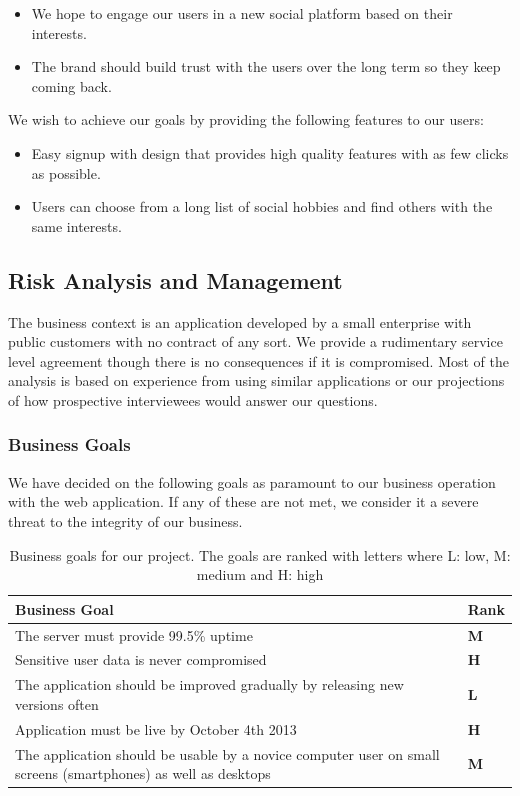 \documentclass[a4paper]{article}
\begin{document}
\begin{itemize}
\item
We hope to engage our users in a new social platform based on their interests.
\item
The brand should build trust with the users over the long term so they keep coming back.
\end{itemize}

We wish to achieve our goals by providing the following features to our users:
\begin{itemize}
\item Easy signup with design that provides high quality features with as few clicks as possible.
\item Users can choose from a long list of social hobbies and find others with the same interests.
\end{itemize}

\subsection{Risk Analysis and Management}
The business context is an application developed by a small enterprise with public customers with no contract of any sort. We provide a rudimentary service level agreement though there is no consequences if it is compromised. Most of the analysis is based on experience from using similar applications or our projections of how prospective interviewees would answer our questions.
\subsubsection{Business Goals}
We have decided on the following goals as paramount to our business operation with the web application. If any of these are not met, we consider it a severe threat to the integrity of our business.

\begin{table}[h!]
	\begin{tabular}{|p{10cm}|l|}
		\hline
		\textbf{Business Goal} & \textbf{Rank} \\ \hline
		The server must provide 99.5\% uptime   & \textbf{M} \\ \hline
		Sensitive user data is never compromised & \textbf{H} \\ \hline
		The application should be improved gradually by releasing new versions often & \textbf{L} \\ \hline
		Application must be live by October 4th 2013 &	\textbf{H}\\ \hline
		The application should be usable by a novice computer user on small screens (smartphones) as well as desktops & \textbf{M}\\ \hline
	\end{tabular}
	\caption{Business goals for our project. The goals are ranked with letters where L: low, M: medium and H: high}
	\label{tab:business_goals}
\end{table}
\end{document}
